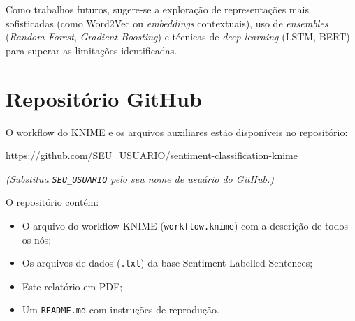 \documentclass[12pt,a4paper]{article}
\begin{document}
Como trabalhos futuros, sugere-se a exploração de representações mais sofisticadas (como Word2Vec ou \textit{embeddings} contextuais), uso de \textit{ensembles} (\textit{Random Forest}, \textit{Gradient Boosting}) e técnicas de \textit{deep learning} (LSTM, BERT) para superar as limitações identificadas.

\section{Repositório GitHub}

O workflow do KNIME e os arquivos auxiliares estão disponíveis no repositório:

\begin{center}
\Large
\url{https://github.com/SEU_USUARIO/sentiment-classification-knime}
\end{center}

\textit{(Substitua \texttt{SEU\_USUARIO} pelo seu nome de usuário do GitHub.)}

\vspace{0.5cm}
\noindent O repositório contém:
\begin{itemize}[leftmargin=*]
    \item O arquivo do workflow KNIME (\texttt{workflow.knime}) com a descrição de todos os nós;
    \item Os arquivos de dados (\texttt{.txt}) da base Sentiment Labelled Sentences;
    \item Este relatório em PDF;
    \item Um \texttt{README.md} com instruções de reprodução.
\end{itemize}
\end{document}
